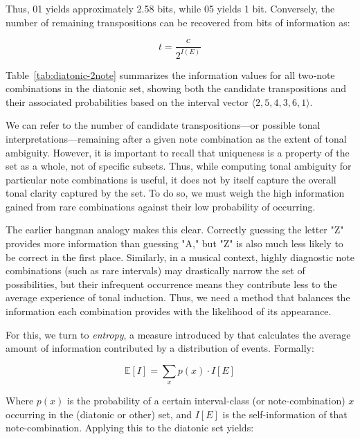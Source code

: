 \documentclass[10pt,twocolumn]{article}
\numberwithin{equation}{section} %
\begin{document}
    Thus, 01 yields approximately 2.58 bits, while 05 yields 1 bit.
    Conversely, the number of remaining transpositions can be recovered from bits of information as:

    \begin{equation}
        t = \frac{c}{2^{I(E)}}
        \label{eq:remaining_transpositions}
    \end{equation}

    Table~\ref{tab:diatonic-2note} summarizes the information values for all two‑note combinations in the diatonic set, showing both the candidate transpositions and their associated probabilities based on the interval vector $\langle 2,5,4,3,6,1\rangle$.

    

    We can refer to the number of candidate transpositions—or possible tonal interpretations—remaining after a given note combination as the extent of tonal ambiguity.
    However, it is important to recall that uniqueness is a property of the set as a whole, not of specific subsets.
    Thus, while computing tonal ambiguity for particular note combinations is useful, it does not by itself capture the overall tonal clarity captured by the set.
    To do so, we must weigh the high information gained from rare combinations against their low probability of occurring.

    The earlier hangman analogy makes this clear.
    Correctly guessing the letter "Z" provides more information than guessing "A," but "Z" is also much less likely to be correct in the first place.
    Similarly, in a musical context, highly diagnostic note combinations (such as rare intervals) may drastically narrow the set of possibilities, but their infrequent occurrence means they contribute less to the average experience of tonal induction.
    Thus, we need a method that balances the information each combination provides with the likelihood of its appearance.

    For this, we turn to \textit{entropy}, a measure introduced by \citet{shannon1948} that calculates the average amount of information contributed by a distribution of events.
    Formally:

    \begin{equation}
        \mathbb{E}[I] = \sum_{x} p(x) \cdot I[E]
        \label{eq:expected-info}
    \end{equation}

    Where $p(x)$ is the probability of a certain interval-class (or note-combination) $x$ occurring in the (diatonic or other) set, and $I[E]$ is the self-information of that note-combination.
    Applying this to the diatonic set yields:
\end{document}
